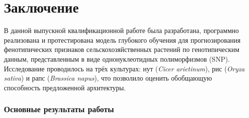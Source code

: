 \chapter*{Заключение} \label{ch-conclusion}

\noindent
В данной выпускной квалификационной работе была разработана, программно 
реализована и протестирована модель глубокого обучения для прогнозирования 
фенотипических признаков сельскохозяйственных растений по генотипическим 
данным, представленным в виде однонуклеотидных полиморфизмов (SNP). 
Исследование проводилось на трёх культурах: нут (\textit{Cicer arietinum}), 
рис (\textit{Oryza sativa}) и рапс (\textit{Brassica napus}), что позволило 
оценить обобщающую способность предложенной архитектуры.

\subsection*{Основные результаты работы}

